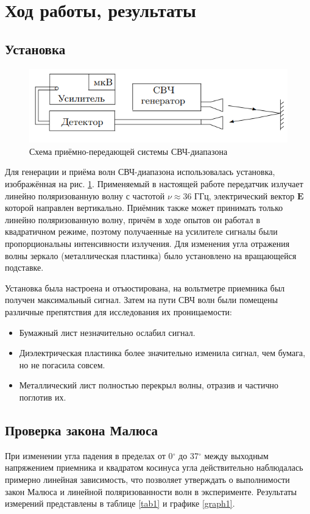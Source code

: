 \section{Ход работы, результаты}

\subsection{Установка}
\begin{figure}[H]
    \centering
    \includegraphics{pic/setup0.png}
    \caption{Схема приёмно-передающей системы СВЧ-диапазона}
    \label{fig:setup0}
\end{figure}
Для генерации и приёма волн СВЧ-диапазона использовалась установка, изображённая на рис. \ref{fig:setup0}. Применяемый в настоящей работе передатчик излучает линейно поляризованную волну с частотой $\nu\approx36$ ГГц, электрический вектор $\mathbf{E}$ которой направлен вертикально. Приёмник также может принимать только линейно поляризованную волну, причём в ходе опытов он работал в квадратичном режиме, поэтому получаенные на усилителе сигналы были пропорциональны интенсивности излучения. Для изменения угла отражения волны зеркало (металлическая пластинка) было установлено на вращающейся подставке.

Установка была настроена и отъюстирована, на вольтметре приемника был получен максимальный сигнал. Затем на пути СВЧ волн были помещены различные препятствия для исследования их проницаемости:
\begin{itemize}
    \item Бумажный лист незначительно ослабил сигнал.
    \item Диэлектрическая пластинка более значительно изменила сигнал, чем бумага, но не погасила совсем.
    \item Металлический лист полностью перекрыл волны, отразив и частично поглотив их.
\end{itemize}

\subsection{Проверка закона Малюса}
При изменении угла падения в пределах от 0$^\circ$ до 37$^\circ$ между выходным напряжением приемника и квадратом косинуса угла действительно наблюдалась примерно линейная зависимость, что позволяет утверждать о выполнимости закон Малюса и линейной поляризованности волн в эксперименте. Результаты измерений представлены в таблице \ref{tab1} и графике \ref{graph1}.

